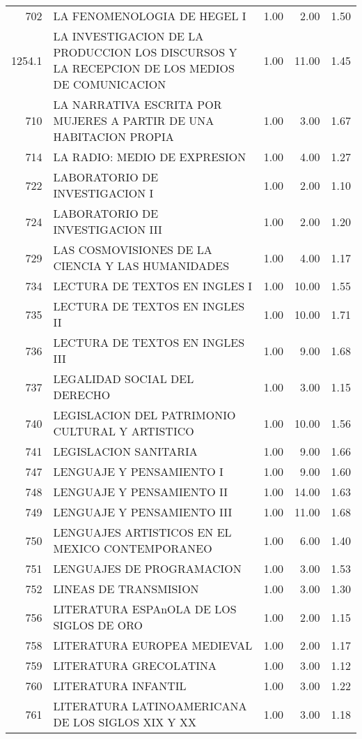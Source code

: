 \documentclass[12pt]{article}
\begin{document}
\begin{table}[ht]
\begin{tabular}{rlrrr}
  702 & LA FENOMENOLOGIA DE HEGEL I & 1.00 & 2.00 & 1.50 \\ 
  1254.1 & LA INVESTIGACION DE LA PRODUCCION LOS DISCURSOS Y LA RECEPCION DE LOS MEDIOS DE COMUNICACION & 1.00 & 11.00 & 1.45 \\ 
  710 & LA NARRATIVA ESCRITA POR MUJERES A PARTIR DE UNA HABITACION PROPIA & 1.00 & 3.00 & 1.67 \\ 
  714 & LA RADIO: MEDIO DE EXPRESION & 1.00 & 4.00 & 1.27 \\ 
  722 & LABORATORIO DE INVESTIGACION I & 1.00 & 2.00 & 1.10 \\ 
  724 & LABORATORIO DE INVESTIGACION III & 1.00 & 2.00 & 1.20 \\ 
  729 & LAS COSMOVISIONES DE LA CIENCIA Y LAS HUMANIDADES & 1.00 & 4.00 & 1.17 \\ 
  734 & LECTURA DE TEXTOS EN INGLES I & 1.00 & 10.00 & 1.55 \\ 
  735 & LECTURA DE TEXTOS EN INGLES II & 1.00 & 10.00 & 1.71 \\ 
  736 & LECTURA DE TEXTOS EN INGLES III & 1.00 & 9.00 & 1.68 \\ 
  737 & LEGALIDAD SOCIAL DEL DERECHO & 1.00 & 3.00 & 1.15 \\ 
  740 & LEGISLACION DEL PATRIMONIO CULTURAL Y ARTISTICO & 1.00 & 10.00 & 1.56 \\ 
  741 & LEGISLACION SANITARIA & 1.00 & 9.00 & 1.66 \\ 
  747 & LENGUAJE Y PENSAMIENTO I & 1.00 & 9.00 & 1.60 \\ 
  748 & LENGUAJE Y PENSAMIENTO II & 1.00 & 14.00 & 1.63 \\ 
  749 & LENGUAJE Y PENSAMIENTO III & 1.00 & 11.00 & 1.68 \\ 
  750 & LENGUAJES ARTISTICOS EN EL MEXICO CONTEMPORANEO & 1.00 & 6.00 & 1.40 \\ 
  751 & LENGUAJES DE PROGRAMACION & 1.00 & 3.00 & 1.53 \\ 
  752 & LINEAS DE TRANSMISION & 1.00 & 3.00 & 1.30 \\ 
  756 & LITERATURA ESPAnOLA DE LOS SIGLOS DE ORO & 1.00 & 2.00 & 1.15 \\ 
  758 & LITERATURA EUROPEA MEDIEVAL & 1.00 & 2.00 & 1.17 \\ 
  759 & LITERATURA GRECOLATINA & 1.00 & 3.00 & 1.12 \\ 
  760 & LITERATURA INFANTIL & 1.00 & 3.00 & 1.22 \\ 
  761 & LITERATURA LATINOAMERICANA DE LOS SIGLOS XIX Y XX & 1.00 & 3.00 & 1.18 \\ 

\end{tabular}
\end{table}
\end{document}
